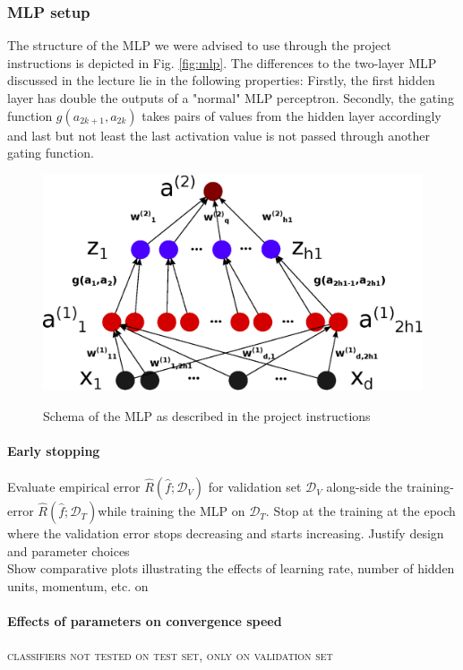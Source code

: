 \subsubsection{MLP setup}
The structure of the MLP we were advised to use through the project instructions is depicted in Fig. \ref{fig:mlp}. The differences to the two-layer MLP discussed in the lecture lie in the following properties: Firstly, the first hidden layer has double the outputs of a "normal" MLP perceptron. Secondly, the gating function $g(a_{2k+1}, a_{2k})$ takes pairs of values from the hidden layer accordingly and last but not least the last activation value is not passed through another gating function.
\begin{figure}[!h]
	\centering
	\includegraphics[width=.8\textwidth]{mlp/mlp.eps}
	\label{mlp}
	\caption{Schema of the MLP as described in the project instructions}
\end{figure}
\newline
\paragraph{Early stopping}
Evaluate empirical error $\hat{R}(\hat{f};\mathcal{D}_V)$ for validation set $\mathcal{D}_V$ along-side the training-error $\hat{R}(\hat{f};\mathcal{D}_T)$while training the MLP on $\mathcal{D}_T$. Stop at the training at the epoch where the validation error stops decreasing and starts increasing. 
\newline
Justify design and parameter choices\\
Show comparative plots illustrating the effects of learning rate, number of hidden units, momentum, etc. on\\

\paragraph{Effects of parameters on convergence speed}
\textsc{classifiers not tested on test set, only on validation set}

